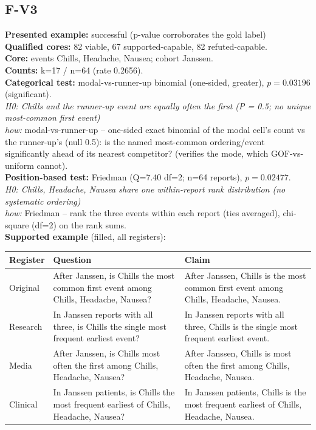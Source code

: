 \documentclass[11pt]{article}
\begin{document}
\subsection*{F-V3}
\textbf{Presented example:} successful (p-value corroborates the gold label) \\
\textbf{Qualified cores:} 82 viable, 67 supported-capable, 82 refuted-capable. \\
\textbf{Core:} events Chills, Headache, Nausea; cohort Janssen. \\
\textbf{Counts:} k=17 / n=64  (rate 0.2656). \\
\textbf{Categorical test:} modal-vs-runner-up binomial (one-sided, greater), $p = 0.03196$ (significant). \\
\emph{H0: Chills and the runner-up event are equally often the first (P = 0.5; no unique most-common first event)} \\
\emph{how:} modal-vs-runner-up -- one-sided exact binomial of the modal cell's count vs the runner-up's (null 0.5): is the named most-common ordering/event significantly ahead of its nearest competitor? (verifies the mode, which GOF-vs-uniform cannot). \\
\textbf{Position-based test:} Friedman (Q=7.40 df=2; n=64 reports), $p = 0.02477$. \\
\emph{H0: Chills, Headache, Nausea share one within-report rank distribution (no systematic ordering)} \\
\emph{how:} Friedman -- rank the three events within each report (ties averaged), chi-square (df=2) on the rank sums. \\
\textbf{Supported example} (filled, all registers): \\
\begin{tabularx}{\linewidth}{@{}l L L@{}}
\toprule
\textbf{Register} & \textbf{Question} & \textbf{Claim} \\
\midrule
Original & After Janssen, is Chills the most common first event among Chills, Headache, Nausea? & After Janssen, Chills is the most common first event among Chills, Headache, Nausea. \\
Research & In Janssen reports with all three, is Chills the single most frequent earliest event? & In Janssen reports with all three, Chills is the single most frequent earliest event. \\
Media & After Janssen, is Chills most often the first among Chills, Headache, Nausea? & After Janssen, Chills is most often the first among Chills, Headache, Nausea. \\
Clinical & In Janssen patients, is Chills the most frequent earliest of Chills, Headache, Nausea? & In Janssen patients, Chills is the most frequent earliest of Chills, Headache, Nausea. \\
\bottomrule
\end{tabularx}
\end{document}
